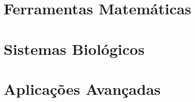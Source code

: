 \documentclass[12pt, a4paper, twoside, openright]{book}
\theoremstyle{definition}
\theoremstyle{plain}
\begin{document}
\part{Ferramentas Matem\'aticas}



\part{Sistemas Biol\'ogicos}






\part{Aplica\c{c}\~oes Avan\c{c}adas}






\backmatter
\printindex
\end{document}
